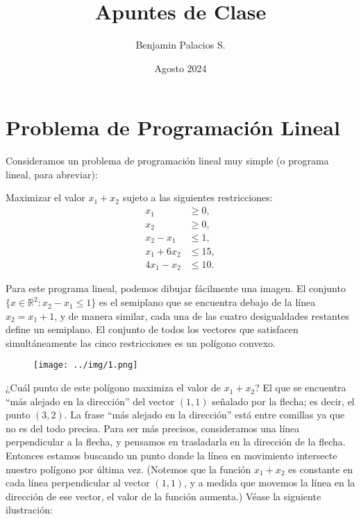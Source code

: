 \documentclass{article}
\title{Apuntes de Clase}
\author{Benjamin Palacios S.}
\date{Agosto 2024}
\begin{document}
\maketitle

\tableofcontents   %
\newpage
\section{Problema de Programación Lineal}

Consideramos un problema de programación lineal muy simple (o programa lineal, para abreviar):

Maximizar el valor \( x_1 + x_2 \) sujeto a las siguientes restricciones:
\begin{align*}
x_1 &\geq 0, \\
x_2 &\geq 0, \\
x_2 - x_1 &\leq 1, \\
x_1 + 6x_2 &\leq 15, \\
4x_1 - x_2 &\leq 10.
\end{align*}

Para este programa lineal, podemos dibujar fácilmente una imagen. El conjunto \(\{x \in \mathbb{R}^2 : x_2 - x_1 \leq 1\}\) es el semiplano que se encuentra debajo de la línea \(x_2 = x_1 + 1\), y de manera similar, cada una de las cuatro desigualdades restantes define un semiplano. El conjunto de todos los vectores que satisfacen simultáneamente las cinco restricciones es un polígono convexo.

\begin{figure}[H] %
\centering %
\texttt{[image: ../img/1.png]} %
\label{fig:imagen} %
\end{figure}
¿Cuál punto de este polígono maximiza el valor de \( x_1 + x_2 \)? El que se encuentra “más alejado en la dirección” del vector \( (1, 1) \) señalado por la flecha; es decir, el punto \( (3, 2) \). La frase “más alejado en la dirección” está entre comillas ya que no es del todo precisa. Para ser más precisos, consideramos una línea perpendicular a la flecha, y pensamos en trasladarla en la dirección de la flecha. Entonces estamos buscando un punto donde la línea en movimiento intersecte nuestro polígono por última vez. (Notemos que la función \( x_1 + x_2 \) es constante en cada línea perpendicular al vector \( (1, 1) \), y a medida que movemos la línea en la dirección de ese vector, el valor de la función aumenta.) Véase la siguiente ilustración:
\end{document}
